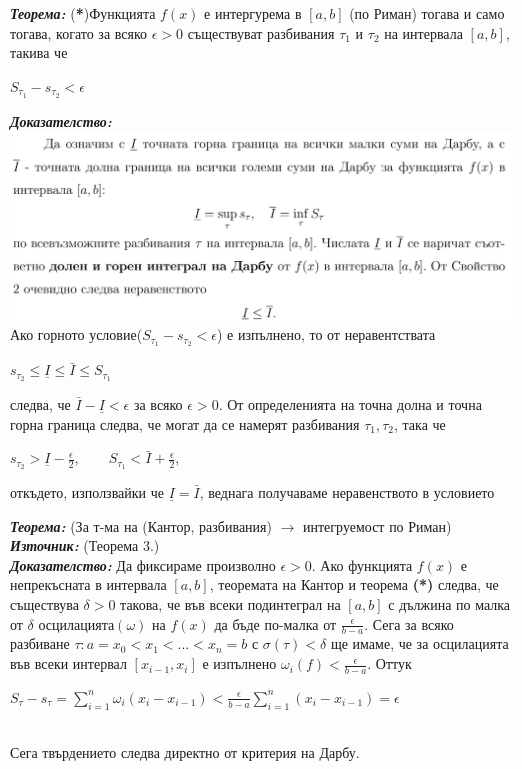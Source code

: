 \documentclass[11pt]{article} %
\newcommand{\italicBold}[1]{\textbf{\emph{#1}}}
\newcommand{\theorem}{\italicBold{Теорема: }}
\newcommand{\proof}{\italicBold{Доказателство: }}
\newcommand{\source}{\italicBold{Източник: }}
\begin{document}
\theorem (\textbf{*})Функцията $f(x)$ е интергурема в $[a,b]$ (по Риман) тогава и само тогава, когато за всяко $\epsilon > 0$ съществуват разбивания $\tau_{1}$ и $\tau_{2}$ на интервала $[a,b]$, такива че \\
\centerline{$S_{\tau_1}-s_{\tau_2} < \epsilon$}
\proof \\
\includegraphics[scale=0.45]{UpperLowerDarbouxIntegral.png}
\\
Ако горното условие($S_{\tau_1}-s_{\tau_2}<\epsilon$) е изпълнено, то от неравентствата\\
\centerline{$s_{\tau_2} \leq \underline{I} \leq \bar{I} \leq S_{\tau_1}$}
следва, че $\bar{I}-\underline{I} < \epsilon$ за всяко $\epsilon > 0$. От определенията на точна долна и точна горна граница следва, че могат да се намерят разбивания $\tau_{1}, \tau_{2}$, така че\\
\centerline{$s_{\tau_2} > \underline{I}-\frac{\epsilon}{2}, \qquad S_{\tau_1} < \bar{I} + \frac{\epsilon}{2}$,}
откъдето, използвайки че $\underline{I} = \bar{I}$, веднага получаваме неравенството в условието\\\par

\theorem (За т-ма на (Кантор, разбивания) $\rightarrow$ интегруемост по Риман)
\source {} (Теорема 3.) \\
\proof Да фиксираме произволно $\epsilon > 0$. Ако функцията $f(x)$ е непрекъсната в интервала $[a,b]$, теоремата на Кантор и теорема \textbf{(*)} следва, че съществува $\delta > 0$ такова, че във всеки подинтеграл на $[a,b]$ с дължина по малка от $\delta$ осцилацията$(\omega)$ на $f(x)$ да бъде по-малка от $\frac{\epsilon}{b-a}$. Сега за всяко разбиване $\tau : a = x_{0} < x_{1} < ... < x_{n} = b$ с $\sigma(\tau) < \delta$ ще имаме, че за осцилацията във всеки интервал $[x_{i-1}, x_{i}]$ е изпълнено $\omega_{i}(f) < \frac{\epsilon}{b-a}$. Оттук\\
\centerline{$S_{\tau}-s_{\tau}=\displaystyle \sum_{i=1}^{n}\omega_{i}(x_{i}-x_{i-1}) < \frac{\epsilon}{b-a}\sum_{i=1}^{n}(x_{i}-x_{i-1})=\epsilon$}\\
Сега твърдението следва директно от критерия на Дарбу.
\end{document}
